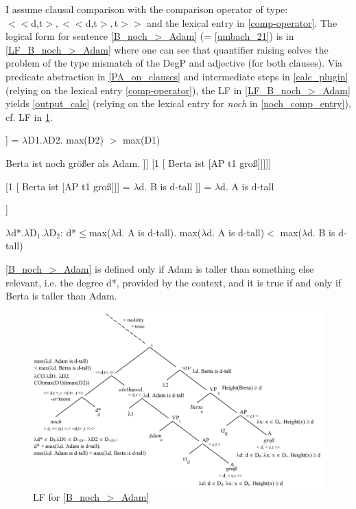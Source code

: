 \documentclass[output=paper,
modfonts
]{langscibook}
\begin{document}
I assume clausal comparison with the comparison operator of type:\\ \mbox{$<<$d,t$>,<<$d,t$>,$t$>>$} \citep[cf.][]{Beck2011} and the lexical entry in \ref{comp-operator}. The logical form for sentence \ref{B_noch_>_Adam} (= \ref{umbach_21}) is in \ref{LF_B_noch_>_Adam} where one can see that quantifier raising solves the problem of the type mismatch of the DegP and adjective (for both clauses). Via predicate abstraction in \ref{PA_on_clauses} and intermediate steps in \ref{calc_plugin}(relying on the lexical entry \ref{comp-operator}), the LF in \ref{LF_B_noch_>_Adam} yields \ref{output_calc} (relying on the lexical entry for \textit{noch} in \ref{noch_comp_entry}), cf. LF in \ref{fig:LF_B_noch_>_Adam}.

\ea\relax [[-er]] = $\lambda$D1.$\lambda$D2. max(D2) $>$ max(D1) \label{comp-operator}\z

\ea\ea Berta ist noch größer als Adam. \label{B_noch_>_Adam}
\ex [ noch d* [-er than [2[Adam ist [AP t2 groß]]] [1 [ Berta ist [AP t1 groß]]]]] \label{LF_B_noch_>_Adam}
\z\z

\ea\ea \label{PA_on_clauses} [1 [ Berta ist [AP t1 groß]]] = $\lambda$d. B is d-tall
\ex\relax [2 [Adam ist [AP t2 groß]]] =  $\lambda$d. A is d-tall \z\z

\ea\relax [ noch d* [$\lambda$D1.$\lambda$D2. max($\lambda$d. B is d-tall) $>$ max($\lambda$d$'$. A is d$'$-tall) ]] \label{calc_plugin}\z

\ea $\lambda$d*.$\lambda$D$_1$.$\lambda$D$_2$: d*$\leq$max($\lambda$d. A is d-tall). max($\lambda$d. A is d-tall)$<$ max($\lambda$d. B is d-tall)  \label{output_calc}\z

\ea \ref{B_noch_>_Adam} is defined only if Adam is taller than something else relevant, i.e. the degree d*, provided by the context, and it is true if and only if Berta is taller than Adam.\z

\begin{figure}
\includegraphics[width=1\textwidth]{figures/LF-mod_comp}
\caption{LF for \ref{B_noch_>_Adam}}
\label{fig:LF_B_noch_>_Adam}
\end{figure}
\end{document}
